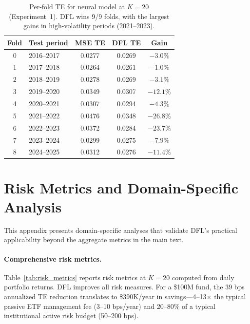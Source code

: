 \documentclass[letterpaper]{article}
\begin{document}
\begin{table}[h]
\centering
\caption{Per-fold TE for neural model at $K{=}20$ (Experiment~1). DFL wins 9/9 folds, with the largest gains in high-volatility periods (2021--2023).}
\label{tab:folds_exp1}
\small
\begin{tabular}{@{}clccc@{}}
\toprule
Fold & Test period & MSE TE & DFL TE & Gain \\
\midrule
0 & 2016--2017 & 0.0277 & 0.0269 & $-3.0\%$ \\
1 & 2017--2018 & 0.0264 & 0.0261 & $-1.0\%$ \\
2 & 2018--2019 & 0.0278 & 0.0269 & $-3.1\%$ \\
3 & 2019--2020 & 0.0349 & 0.0307 & $-12.1\%$ \\
4 & 2020--2021 & 0.0307 & 0.0294 & $-4.3\%$ \\
5 & 2021--2022 & 0.0476 & 0.0348 & $-26.8\%$ \\
6 & 2022--2023 & 0.0372 & 0.0284 & $-23.7\%$ \\
7 & 2023--2024 & 0.0299 & 0.0275 & $-7.9\%$ \\
8 & 2024--2025 & 0.0312 & 0.0276 & $-11.4\%$ \\
\bottomrule
\end{tabular}
\end{table}

\section{Risk Metrics and Domain-Specific Analysis}
\label{app:risk}

This appendix presents domain-specific analyses that validate DFL's practical applicability beyond the aggregate metrics in the main text.

\paragraph{Comprehensive risk metrics.}
Table~\ref{tab:risk_metrics} reports risk metrics at $K{=}20$ computed from daily portfolio returns. DFL improves all risk measures. For a \$100M fund, the 39 bps annualized TE reduction translates to \$390K/year in savings---4--13$\times$ the typical passive ETF management fee (3--10 bps/year) and 20--80\% of a typical institutional active risk budget (50--200 bps).
\end{document}
